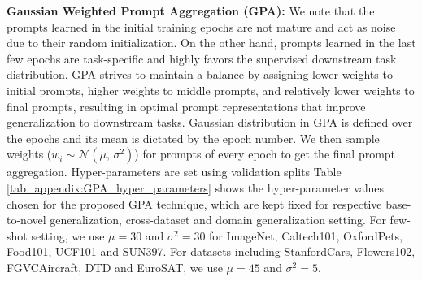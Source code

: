 \documentclass[10pt,twocolumn,letterpaper]{article}
\begin{document}
\noindent \textbf{Gaussian Weighted Prompt Aggregation (GPA):}
We note that the prompts learned in the initial training epochs are not mature and act as noise due to their random initialization. 
On the other hand, prompts learned in the last few epochs are task-specific and highly favors the supervised downstream task distribution. GPA strives to maintain a balance by assigning lower weights to initial prompts, higher weights to middle prompts, and relatively lower weights to final prompts, resulting in optimal prompt representations that improve generalization to downstream tasks. Gaussian distribution in GPA is defined over the epochs and its mean is dictated by the epoch number. We then sample weights ($w_{i} \sim \mathcal{N}(\mu,\,\sigma^{2})$) for prompts of every epoch to get the final prompt aggregation. Hyper-parameters are set using validation splits
Table \ref{tab_appendix:GPA_hyper_parameters} shows the hyper-parameter values chosen for the proposed GPA technique, which are kept fixed for respective base-to-novel generalization, cross-dataset and domain generalization setting. For few-shot setting, we use $\mu=30$ and $\sigma^2=30$ for ImageNet, Caltech101, OxfordPets, Food101, UCF101 and  SUN397. For datasets including StanfordCars, Flowers102, FGVCAircraft, DTD and EuroSAT, we use $\mu=45$ and $\sigma^2=5$.


\end{document}
